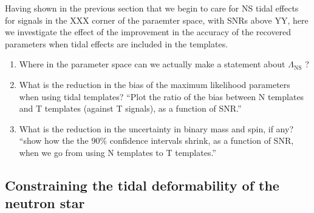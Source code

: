 \documentclass[aps,prd,amsmath,floats,floatfix, twocolumn,
superscriptaddress,nofootinbib,showpacs]{revtex4-1}
\begin{document}
%

Having shown in the previous section that we begin to care for NS tidal effects
for signals in the XXX corner of the paraemter space, with SNRs above YY, here
we investigate the effect of the improvement in the accuracy of the recovered
parameters when tidal effects are included in the templates.

\begin{enumerate}
\item Where in the parameter space can we actually make a statement about 
$\Lambda_\mathrm{NS}$ ?
\item What is the reduction in the bias of the maximum likelihood parameters
when using tidal templates?\newline
``Plot the ratio of the bias between N templates and T templates (against T
signals), as a function of SNR.''
\item What is the reduction in the uncertainty in binary mass and spin, if
any?\newline
``show how the the $90\%$ confidence intervals shrink, as a function of SNR, 
when we go from using N templates to T templates.''
\end{enumerate}


\subsection{Constraining the tidal deformability of the neutron star}\label{s2:measuring_lambda}
\end{document}
